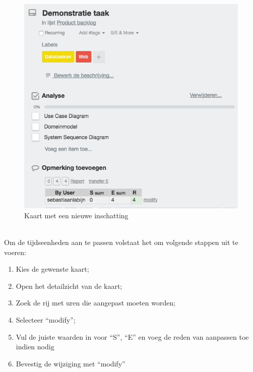 \begin{figure}[H]
	\centering
	\includegraphics[scale=0.4]{./afbeeldingen/aangemaakte_prestatie.png}
	\caption{Kaart met een nieuwe inschatting}
	\label{fig:aangemaakte_prestatie}	
\end{figure} 

\\
Om de tijdseenheden aan te passen volstaat het om volgende stappen uit te voeren:
\begin{enumerate}[nolistsep]
	\item Kies de gewenste kaart;
	\item Open het detailzicht van de kaart;
	\item Zoek de rij met uren die aangepast moeten worden;
	\item Selecteer ``modify'';
	\item Vul de juiste waarden in voor ``S'', ``E'' en voeg de reden van aanpassen toe indien nodig 
	\item Bevestig de wijziging met ``modify''
\end{enumerate}

